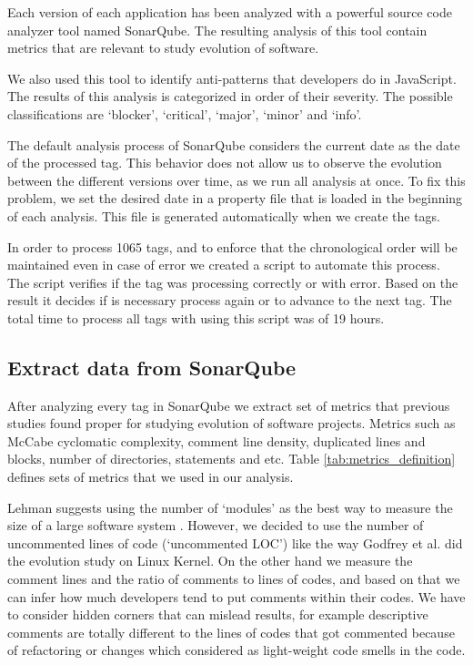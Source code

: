 \par
Each version of each application has been analyzed with a powerful source code analyzer tool named SonarQube. The resulting analysis of this tool contain metrics that are relevant to study evolution of software. 
\par
We also used this tool to identify anti-patterns that developers do in JavaScript. The results of this analysis is categorized in order of their severity. The possible classifications are `blocker', `critical', `major', `minor' and `info'.
\par
The default analysis process of SonarQube considers the current date as the date of the processed tag. This behavior does not allow us to observe the evolution between the different versions over time, as we run all analysis at once. To fix this problem, we set the desired date in a property file that is loaded in the beginning of each analysis. This file is generated automatically when we create the tags. 

In order to process 1065 tags, and to enforce that the chronological order will be maintained even in case of error we created a script to automate this process.
The script verifies if the tag was processing correctly or with error. Based on the result it decides if is necessary process again or to advance to the next tag. The total time to  process all tags with using this script was of 19 hours.

\subsection{Extract data from SonarQube}
\par After analyzing every tag in SonarQube we extract set of metrics that previous studies found proper for studying evolution of software projects. Metrics such as McCabe cyclomatic complexity, comment line density, duplicated lines and blocks, number of directories, statements and etc. Table  \ref{tab:metrics_definition} defines sets of metrics that we used in our analysis.

\par
Lehman suggests using the number of `modules' as the best way to measure the size of a large software system \cite{Lehman1997METRICS}. However, we decided to use the number of uncommented lines of code (`uncommented LOC') like the way Godfrey et al. \cite{Godfrey2000ICMS} did the evolution study on Linux Kernel. On the other hand we measure the comment lines and the ratio of comments to lines of codes, and based on that we can infer how much developers tend to put comments within their codes. We have to consider hidden corners that can mislead results, for example descriptive comments are totally different to the lines of codes that got commented because of refactoring or changes which considered as light-weight code smells in the code.

